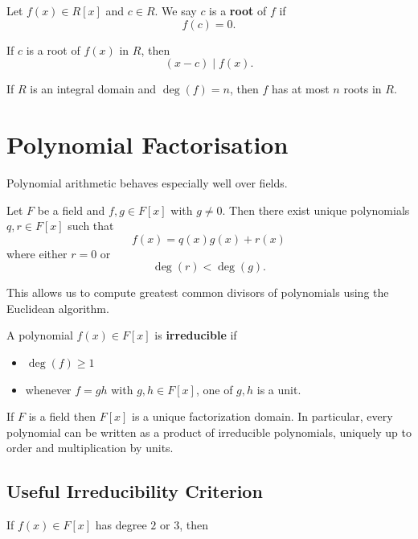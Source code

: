 \begin{defn}
Let $f(x) \in R[x]$ and $c \in R$.
We say $c$ is a \textbf{root} of $f$ if
\[
f(c) = 0 .
\]
\end{defn}

\begin{thm}
If $c$ is a root of $f(x)$ in $R$, then
\[
(x-c) \mid f(x).
\]
\end{thm}

If $R$ is an integral domain and $\deg(f)=n$, then $f$ has at
most $n$ roots in $R$.

\section{Polynomial Factorisation}

Polynomial arithmetic behaves especially well over fields.

\begin{thm}
Let $F$ be a field and $f,g \in F[x]$ with $g \neq 0$.
Then there exist unique polynomials $q,r \in F[x]$ such that
\[
f(x) = q(x)g(x) + r(x)
\]
where either $r=0$ or
\[
\deg(r) < \deg(g).
\]
\end{thm}

This allows us to compute greatest common divisors of polynomials
using the Euclidean algorithm.

\begin{defn}
A polynomial $f(x) \in F[x]$ is \textbf{irreducible} if

\begin{itemize}
\item $\deg(f) \ge 1$
\item whenever $f = gh$ with $g,h \in F[x]$, one of $g,h$
is a unit.
\end{itemize}
\end{defn}

\begin{thm}
If $F$ is a field then $F[x]$ is a unique factorization domain.
In particular, every polynomial can be written as a product of
irreducible polynomials, uniquely up to order and multiplication
by units.
\end{thm}

\subsection{Useful Irreducibility Criterion}

If $f(x) \in F[x]$ has degree $2$ or $3$, then

